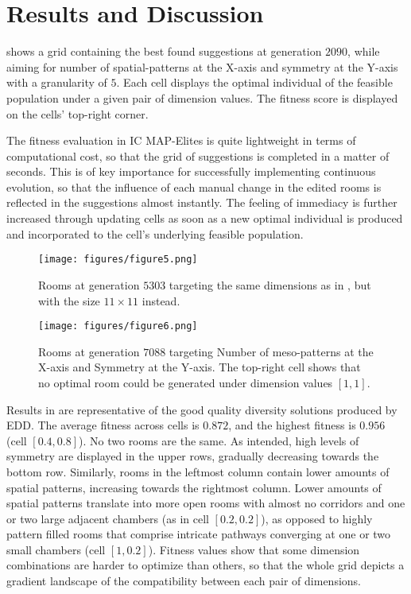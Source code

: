 \documentclass[conference]{IEEEtran}
\begin{document}
\section{Results and Discussion\label{section:results}}
 shows a grid containing the best found suggestions at generation $2090$, while aiming for number of spatial-patterns at the X-axis and symmetry at the Y-axis with a granularity of $5$. Each cell displays the optimal individual of the feasible population under a given pair of dimension values. The fitness score is displayed on the cells' top-right corner.

The fitness evaluation in IC MAP-Elites is quite lightweight in terms of computational cost, so that the grid of suggestions is completed in a matter of seconds. This is of key importance for successfully implementing continuous evolution, so that the influence of each manual change in the edited rooms is reflected in the suggestions almost instantly. The feeling of immediacy is further increased through updating cells as soon as a new optimal individual is produced and incorporated to the cell’s underlying feasible population.

\begin{figure}[ht!]
\centerline{\texttt{[image: figures/figure5.png]}}
\caption{Rooms at generation $5303$ targeting the same dimensions as in , but with the size $11\times11$ instead.}
\label{figs:patt_sym3}
\end{figure}

\begin{figure*}[ht]
\centerline{\texttt{[image: figures/figure6.png]}}
\caption{Rooms at generation $7088$ targeting Number of meso-patterns at the X-axis and Symmetry at the Y-axis. The top-right cell shows that no optimal room could be generated under dimension values $[1,1]$. }
\label{figs:meso_sym}
\end{figure*}

Results in  are representative of the good quality diversity solutions produced by EDD. The average fitness across cells is $0.872$, and the highest fitness is $0.956$ (cell $[0.4,0.8]$). No two rooms are the same. As intended, high levels of symmetry are displayed in the upper rows, gradually decreasing towards the bottom row. Similarly, rooms in the leftmost column contain lower amounts of spatial patterns, increasing towards the rightmost column. Lower amounts of spatial patterns translate into more open rooms with almost no corridors and one or two large adjacent chambers (as in cell $[0.2, 0.2]$), as opposed to highly pattern filled rooms that comprise intricate pathways converging at one or two small chambers (cell $[1, 0.2]$). Fitness values show that some dimension combinations are harder to optimize than others, so that the whole grid depicts a gradient landscape of the compatibility between each pair of dimensions. 
\end{document}
